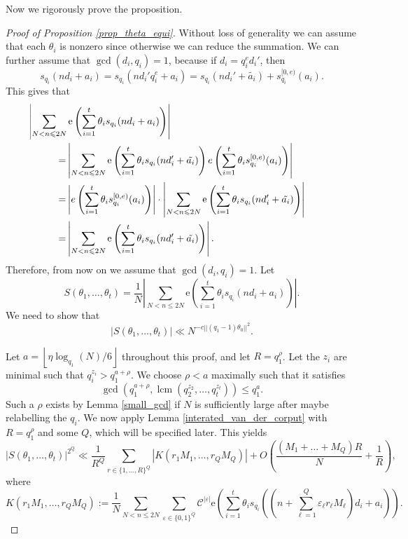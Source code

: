\documentclass[12pt]{amsart}
\renewcommand{\leq}{\leqslant}
\DeclareMathOperator{\lcm}{lcm}
\theoremstyle{definition}
\numberwithin{equation}{section}
\newcommand\e{\mathrm{e}}
\numberwithin{equation}{section}
\begin{document}
Now we rigorously prove the proposition.

\begin{proof}[Proof of Proposition \ref{prop_theta_equi}]
	Without loss of generality we can assume that each $\theta_i$ is nonzero since otherwise we can reduce the summation. We can further assume that $\gcd(d_i,q_i)=1$, because if $d_i=q_i^ed_i'$, then
	\[
		s_{q_i}(nd_i+a_i) = s_{q_i}(nd_i'q_i^e+a_i) = s_{q_i}(nd_i'+\tilde{a_i}) + s_{q_i}^{[0,e)}(a_i).
	\]
	This gives that
	\begin{align*}
		 & \hspace{-40pt}\left|\sum_{N<n\leq 2N}\e\left(\sum_{i=1}^{t}\theta_is_{q_i}(nd_i+a_i)\right)\right| \\
		=&\left|\sum_{N<n\leq 2N} \e\left(\sum_{i=1}^{t}\theta_is_{q_i}(nd_i'+\tilde{a_i})\right)e\left(\sum_{i=1}^{t}\theta_is_{q_i}^{[0,e)}(a_i)\right)\right| \\
		=&\left|e\left(\sum_{i=1}^{t}\theta_is_{q_i}^{[0,e)}(a_i)\right)\right|\cdot \left|\sum_{N<n\leq 2N}\e\left(\sum_{i=1}^{t}\theta_is_{q_i}(nd_i'+\tilde{a_i})\right)\right| \\
		=&\left|\sum_{N<n\leq 2N}\e\left(\sum_{i=1}^{t}\theta_is_{q_i}(nd_i'+\tilde{a_i})\right)\right|.
	\end{align*}
	Therefore, from now on we assume that $\gcd(d_i,q_i)=1$. Let 
	\begin{equation}
		S(\theta_1, \dots, \theta_t) = \frac 1N \left|\sum_{N<n\leq 2N}\e\left(\sum_{i=1}^{t}\theta_is_{q_i}(nd_i+a_i)\right)\right|.
	\end{equation}
	We need to show that 
	\begin{equation}
		|S(\theta_1, \dots, \theta_t)| \ll N^{-c||(q_1-1)\theta_0||^2}.
	\end{equation}

	Let $a=\left\lfloor \eta\log_{q_1}(N)/6 \right\rfloor$ throughout this proof, and let $R=q_1^{\rho}$. Let  the $z_i$ are minimal such that $q_i^{z_i}>q_1^{a+\rho}$. We choose $\rho<a$ maximally such that it satisfies
	\[
		\gcd\left(q_1^{a+\rho},\lcm\left(q_2^{z_2},\dots, q_t^{z_t}\right)\right)\leq q_1^{a}.
	\]
	Such a $\rho$ exists by Lemma \ref{small_gcd} if $N$ is sufficiently large after maybe relabelling the $q_i$. We now apply Lemma \ref{interated_van_der_corput} with $R=q_1^{\rho}$ and some $Q$, which will be specified later. This yields
	\begin{equation}\label{eq_spower}
		|S(\theta_1, \dots, \theta_t)|^{2^Q} \ll \frac {1}{R^Q}\sum_{r\in\{1,\dots,R\}^Q}|K(r_1M_1,\dots,r_{Q}M_{Q})| + O\left(\frac{(M_1+\dots + M_{Q})R}{N}+\frac 1R\right),
	\end{equation}
	where
	\begin{equation}
		K(r_1M_1,\dots, r_QM_Q) := \frac 1N \sum_{N<n\leq 2N} \sum_{\varepsilon\in \{0,1\}^Q}\mathcal{C}^{|\varepsilon|}
		\e\left(\sum_{i=1}^{t}\theta_i s_{q_i}\left(\left(n+\sum_{\ell = 1}^{Q}\varepsilon_{\ell}r_{\ell}M_{\ell}\right)d_i+a_i\right)\right).
	\end{equation}
	

\end{proof}
\end{document}
